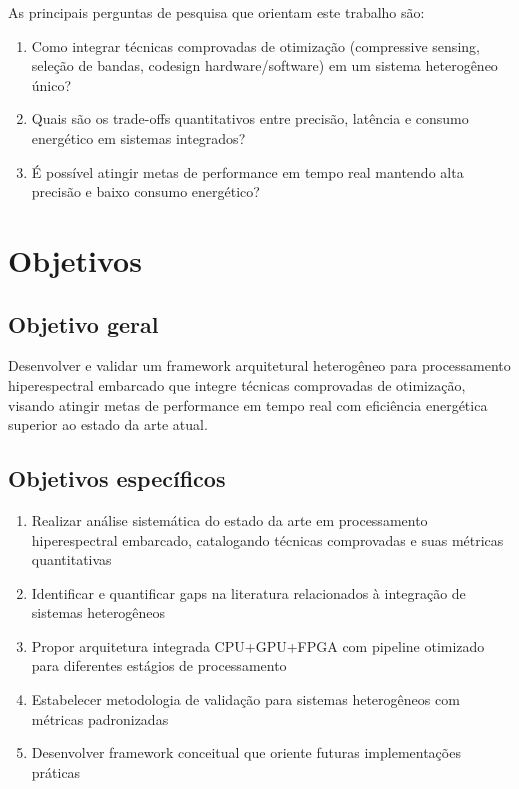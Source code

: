 As principais perguntas de pesquisa que orientam este trabalho são:

\begin{enumerate}
    \item Como integrar técnicas comprovadas de otimização (compressive sensing, seleção de bandas, codesign hardware/software) em um sistema heterogêneo único?
    \item Quais são os trade-offs quantitativos entre precisão, latência e consumo energético em sistemas integrados?
    \item É possível atingir metas de performance em tempo real mantendo alta precisão e baixo consumo energético?
\end{enumerate}

\section{Objetivos}\label{sec:objetivos}

\subsection{Objetivo geral}\label{subsec:objetivo_geral}

Desenvolver e validar um framework arquitetural heterogêneo para processamento hiperespectral embarcado que integre técnicas comprovadas de otimização, visando atingir metas de performance em tempo real com eficiência energética superior ao estado da arte atual.

\subsection{Objetivos específicos}\label{subsec:objetivos_especificos}

\begin{enumerate}
    \item Realizar análise sistemática do estado da arte em processamento hiperespectral embarcado, catalogando técnicas comprovadas e suas métricas quantitativas
    \item Identificar e quantificar gaps na literatura relacionados à integração de sistemas heterogêneos
    \item Propor arquitetura integrada CPU+GPU+FPGA com pipeline otimizado para diferentes estágios de processamento
    \item Estabelecer metodologia de validação para sistemas heterogêneos com métricas padronizadas
    \item Desenvolver framework conceitual que oriente futuras implementações práticas
\end{enumerate}

